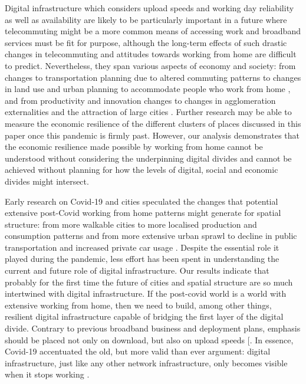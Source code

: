 \documentclass[]{interact}
\theoremstyle{plain}%
\theoremstyle{definition}
\theoremstyle{remark}
\begin{document}
Digital infrastructure which considers upload speeds and working day
reliability as well as availability are likely to be particularly
important in a future where telecommuting might be a more common means
of accessing work and broadband services must be fit for purpose,
although the long-term effects of such drastic changes in telecommuting
and attitudes towards working from home are difficult to predict.
Nevertheless, they span various aspects of economy and society: from
changes to transportation planning due to altered commuting patterns to
changes in land use and urban planning to accommodate people who work
from home \citep{BUDNITZ2020102713, ELLDER2020102777}, and from
productivity and innovation changes to changes in agglomeration
externalities and the attraction of large cities \citep{econobs}.
Further research may be able to measure the economic resilience of the
different clusters of places discussed in this paper once this pandemic
is firmly past. However, our analysis demonstrates that the economic
resilience made possible by working from home cannot be understood
without considering the underpinning digital divides and cannot be
achieved without planning for how the levels of digital, social and
economic divides might intersect.

Early research on Covid-19 and cities speculated the changes that
potential extensive post-Covid working from home patterns might generate
for spatial structure: from more walkable cities to more localised
production and consumption patterns and from more extensive urban sprawl
to decline in public transportation and increased private car usage
\citep{batty2020editorial}. Despite the essential role it played during
the pandemic, less effort has been spent in understanding the current
and future role of digital infrastructure. Our results indicate that
probably for the first time the future of cities and spatial structure
are so much intertwined with digital infrastructure. If the post-covid
world is a world with extensive working from home, then we need to
build, among other things, resilient digital infrastructure capable of
bridging the first layer of the digital divide. Contrary to previous
broadband business and deployment plans, emphasis should be placed not
only on download, but also on upload speeds {[}\citet{brake2020lessons}.
In essence, Covid-19 accentuated the old, but more valid than ever
argument: digital infrastructure, just like any other network
infrastructure, only becomes visible when it stops working
\citep{star1999, tranos2013geography}.
\end{document}
